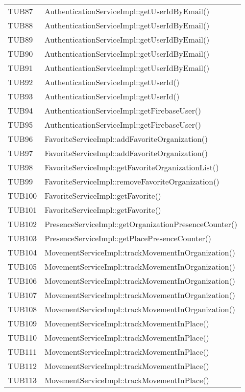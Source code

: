{\begin{longtable}{C{2cm} C{8cm}}
		TUB87 & AuthenticationServiceImpl::getUserIdByEmail()\\
		TUB88 & AuthenticationServiceImpl::getUserIdByEmail()\\
		TUB89 & AuthenticationServiceImpl::getUserIdByEmail()\\
		TUB90 & AuthenticationServiceImpl::getUserIdByEmail()\\
		TUB91 & AuthenticationServiceImpl::getUserIdByEmail()\\
		TUB92 & AuthenticationServiceImpl::getUserId()\\
		TUB93 & AuthenticationServiceImpl::getUserId()\\
		TUB94 & AuthenticationServiceImpl::getFirebaseUser()\\
		TUB95 & AuthenticationServiceImpl::getFirebaseUser()\\
		TUB96 & FavoriteServiceImpl::addFavoriteOrganization()\\
		TUB97 & FavoriteServiceImpl::addFavoriteOrganization()\\
		TUB98 & FavoriteServiceImpl::getFavoriteOrganizationList()\\
		TUB99 & FavoriteServiceImpl::removeFavoriteOrganization()\\
		TUB100 & FavoriteServiceImpl::getFavorite()\\
		TUB101 & FavoriteServiceImpl::getFavorite()\\
		TUB102 & PresenceServiceImpl::getOrganizationPresenceCounter()\\
		TUB103 & PresenceServiceImpl::getPlacePresenceCounter()\\
		TUB104 & MovementServiceImpl::trackMovementInOrganization()\\
		TUB105 & MovementServiceImpl::trackMovementInOrganization()\\
		TUB106 & MovementServiceImpl::trackMovementInOrganization()\\
		TUB107 & MovementServiceImpl::trackMovementInOrganization()\\
		TUB108 & MovementServiceImpl::trackMovementInOrganization()\\
		TUB109 & MovementServiceImpl::trackMovementInPlace()\\
		TUB110 & MovementServiceImpl::trackMovementInPlace()\\
		TUB111 & MovementServiceImpl::trackMovementInPlace()\\
		TUB112 & MovementServiceImpl::trackMovementInPlace()\\
		TUB113 & MovementServiceImpl::trackMovementInPlace()\\

\end{longtable}}
